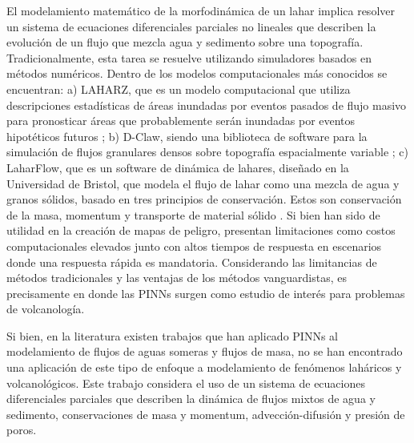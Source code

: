 El modelamiento matemático de la morfodinámica de un lahar implica resolver un sistema de ecuaciones diferenciales parciales no lineales que describen la evolución de un flujo que mezcla agua
y sedimento sobre una topografía. Tradicionalmente, esta tarea se resuelve utilizando simuladores basados en métodos numéricos. Dentro de los modelos computacionales más conocidos se encuentran:
a) LAHARZ, que es un modelo computacional que utiliza descripciones estadísticas de áreas inundadas por eventos pasados de flujo masivo para pronosticar áreas que probablemente serán inundadas por eventos hipotéticos futuros \cite{schilling2008using};
b) D-Claw, siendo una biblioteca de software para la simulación de flujos granulares densos sobre topografía espacialmente variable \cite{george2025d};
c) LaharFlow, que es un software de dinámica de lahares, diseñado en la Universidad de Bristol, que modela el flujo de lahar como una mezcla de agua y granos sólidos, basado en tres principios de conservación. 
Estos son conservación de la masa, momentum y transporte de material sólido \cite{woodhouseshallow}.
Si bien han sido de utilidad en la creación de mapas de peligro, presentan limitaciones como costos computacionales elevados junto con
altos tiempos de respuesta en escenarios donde una respuesta rápida es mandatoria. Considerando las limitancias de métodos tradicionales y las ventajas de los métodos vanguardistas, es precisamente en donde las PINNs surgen como estudio de interés para problemas de volcanología.

Si bien, en la literatura existen trabajos que han aplicado PINNs al modelamiento de flujos de aguas someras y flujos de masa, no se han encontrado una aplicación de este tipo de enfoque a modelamiento de fenómenos laháricos y volcanológicos.
Este trabajo considera el uso de un sistema de ecuaciones diferenciales parciales que describen la dinámica de flujos mixtos de agua y sedimento, conservaciones de masa y momentum, advección-difusión y presión de poros.


